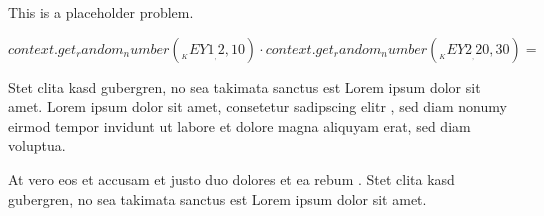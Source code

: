 This is a placeholder problem.
\begin{Problem}
\item ${{context.get_random_number(__KEY1__, 2, 10)}} \cdot {{context.get_random_number(__KEY2__, 20, 30)}} =$
\item Stet clita kasd gubergren, no sea takimata sanctus est Lorem ipsum dolor sit amet. Lorem ipsum dolor sit amet, consetetur sadipscing elitr , sed diam nonumy eirmod tempor invidunt ut labore et dolore magna aliquyam erat, sed diam voluptua. 
\item At vero eos et accusam et justo duo dolores et ea rebum . Stet clita kasd gubergren, no sea takimata sanctus est Lorem ipsum dolor sit amet. 
\end{Problem}